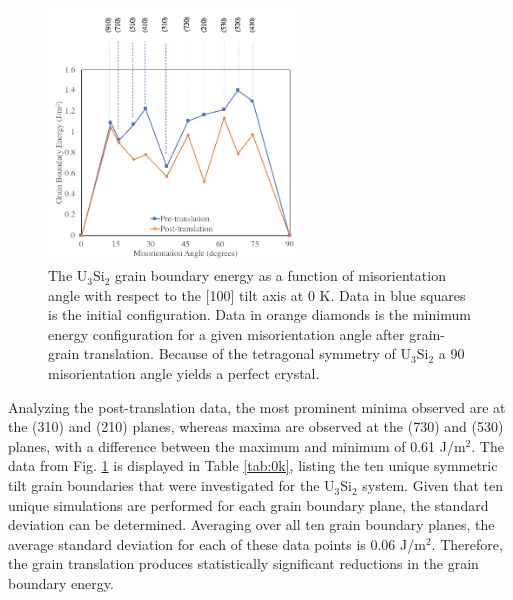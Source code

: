\documentclass[review]{elsarticle}
\begin{document}
\begin{figure}[h]
 \centering
 \includegraphics[width=0.6\textwidth]{translation0k.png} 
 \caption{The U$_{3}$Si$_{2}$ grain boundary energy as a function of misorientation angle with respect to the [100] tilt axis at 0 K. Data in blue squares is the initial configuration. Data in orange diamonds is the minimum energy configuration for a given misorientation angle after grain-grain translation. Because of the tetragonal symmetry of U$_{3}$Si$_{2}$ a 90{\degree} misorientation angle yields a perfect crystal. }
 \label{fig:translate}
\end{figure}

\FloatBarrier

Analyzing the post-translation data, the most prominent minima observed are at the (310) and (210) planes, whereas maxima are observed at the (730) and (530) planes, with a difference between the maximum and minimum of 0.61 J/m$^{2}$.  The data from Fig. \ref{fig:translate} is displayed in Table \ref{tab:0k}, listing the ten unique symmetric tilt grain boundaries that were investigated for the U$_{3}$Si$_{2}$ system. Given that ten unique simulations are performed for each grain boundary plane, the standard deviation can be determined. Averaging over all ten grain boundary planes, the average standard deviation for each of these data points is 0.06 J/m$^{2}$. Therefore, the grain translation produces statistically significant reductions in the grain boundary energy. 
\end{document}

